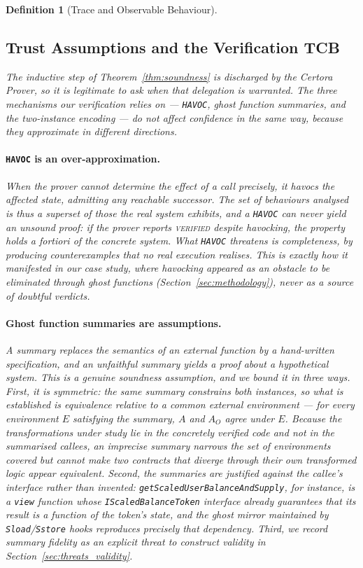 \documentclass[manuscript,screen,review]{acmart}
\newenvironment{revisedblock}{\color{red}}{}
\newtheorem{definition}{Definition}
\begin{document}
\begin{definition}[Trace and Observable Behaviour]
\begin{revisedblock}
\subsection{Trust Assumptions and the Verification TCB}
\label{sec:tcb}

The inductive step of Theorem~\ref{thm:soundness} is discharged by the Certora
Prover, so it is legitimate to ask when that delegation is warranted. The three
mechanisms our verification relies on --- \texttt{HAVOC}, ghost function
summaries, and the two-instance encoding --- do not affect confidence in the
same way, because they approximate in different directions.

\paragraph{\texttt{HAVOC} is an over-approximation.}
When the prover cannot determine the effect of a call precisely, it havocs the
affected state, admitting \emph{any} reachable successor. The set of behaviours
analysed is thus a superset of those the real system exhibits, and a
\texttt{HAVOC} can never yield an unsound proof: if the prover reports
\textsc{verified} despite havocking, the property holds \emph{a fortiori} of
the concrete system. What \texttt{HAVOC} threatens is completeness, by
producing counterexamples that no real execution realises. This is exactly how
it manifested in our case study, where havocking appeared as an obstacle to be
eliminated through ghost functions (Section~\ref{sec:methodology}), never as a
source of doubtful verdicts.

\paragraph{Ghost function summaries are assumptions.}
A summary replaces the semantics of an external function by a hand-written
specification, and an unfaithful summary yields a proof about a hypothetical
system. This is a genuine soundness assumption, and we bound it in three ways.
First, it is \emph{symmetric}: the same summary constrains both instances, so
what is established is equivalence relative to a common external environment
--- for every environment $E$ satisfying the summary, $A$ and $A_O$ agree under
$E$. Because the transformations under study lie in the concretely verified
code and not in the summarised callees, an imprecise summary narrows the set of
environments covered but cannot make two contracts that diverge through their
own transformed logic appear equivalent. Second, the summaries are justified
against the callee's interface rather than invented:
\texttt{getScaledUserBalanceAndSupply}, for instance, is a \texttt{view}
function whose \texttt{IScaledBalanceToken} interface already guarantees that
its result is a function of the token's state, and the ghost mirror maintained
by \texttt{Sload}/\texttt{Sstore} hooks reproduces precisely that dependency.
Third, we record summary fidelity as an explicit threat to construct validity
in Section~\ref{sec:threats_validity}.


\end{revisedblock}
\end{definition}
\end{document}
